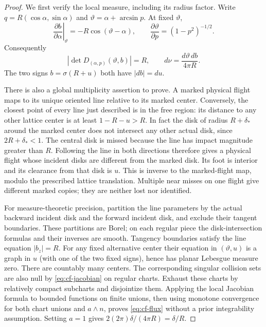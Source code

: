\begin{proof}
We first verify the local measure, including its radius factor. Write
$q=R(\cos\alpha,\sin\alpha)$ and
$\vartheta=\alpha+\arcsin p$. At fixed $\vartheta$,
\[
 \left.\frac{\partial b}{\partial\alpha}\right|_\vartheta
     =-R\cos(\vartheta-\alpha),\qquad
 \frac{\partial\vartheta}{\partial p}=(1-p^2)^{-1/2}.
\]
Consequently
\begin{equation}\label{eq:cf-jacobian}
 \left|\det D_{(\alpha,p)}(\vartheta,b)\right|=R,
 \qquad d\nu=\frac{d\vartheta\,db}{4\pi R}.
\end{equation}
The two signs $b=\sigma(R+u)$ both have $|db|=du$.

There is also a global multiplicity assertion to prove. A marked
physical flight maps to its unique oriented line relative to its
marked center. Conversely, the closest point of every line just
described is in the free region: its distance to any other lattice
center is at least $1-R-u>R$. In fact the disk of radius $R+\delta_*$
around the marked center does not intersect any other actual disk,
since $2R+\delta_*<1$. The central disk is missed because the line
has impact magnitude greater than $R$. Following the line in both
directions therefore gives a physical flight whose incident disks
are different from the marked disk. Its foot is interior and its
clearance from that disk is $u$. This is inverse to the marked-flight
map, modulo the prescribed lattice translation. Multiple near misses
on one flight give different marked copies; they are neither lost nor
identified.

For measure-theoretic precision, partition the line parameters by the
actual backward incident disk and the forward incident disk, and
exclude their tangent boundaries. These partitions are Borel; on each
regular piece the disk-intersection formulas and their inverses are
smooth. Tangency boundaries satisfy the line equation $|b_z|=R$.
For any fixed alternative center their equation in $(\vartheta,u)$
is a graph in $u$ (with one of the two fixed signs), hence has planar
Lebesgue measure zero. There are countably many centers. The
corresponding singular collision sets are also null by
\eqref{eq:cf-jacobian} on regular charts. Exhaust these charts by
relatively compact subcharts and disjointize them. Applying the local
Jacobian formula to bounded functions on finite unions, then using
monotone convergence for both chart unions and $a\wedge n$, proves
\eqref{eq:cf-flux} without a prior integrability assumption. Setting
$a=1$ gives $2(2\pi)\delta/(4\pi R)=\delta/R$.
\end{proof}

